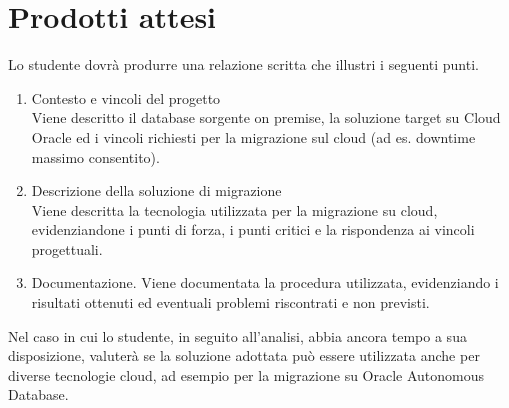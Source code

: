 \section*{Prodotti attesi}
Lo studente dovrà produrre una relazione scritta che illustri i seguenti punti.
\begin{enumerate}
    \item Contesto e vincoli del progetto \\
    Viene descritto il database sorgente on premise, la soluzione target su Cloud Oracle ed i vincoli richiesti per la migrazione sul cloud (ad es. downtime massimo consentito).
    
    \item Descrizione della soluzione di migrazione \\
    Viene descritta la tecnologia utilizzata per la migrazione su cloud, evidenziandone i punti di forza, i punti critici e la rispondenza ai vincoli progettuali.
    
    \item Documentazione.
    Viene documentata la procedura utilizzata, evidenziando i risultati ottenuti ed eventuali problemi riscontrati e non previsti.
\end{enumerate}

Nel caso in cui lo studente, in seguito all'analisi, abbia ancora tempo a sua disposizione, valuterà se la soluzione adottata può essere utilizzata anche per diverse tecnologie cloud, ad esempio per la migrazione su Oracle Autonomous Database.

